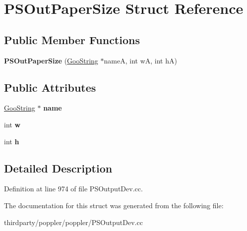 \hypertarget{struct_p_s_out_paper_size}{}\section{P\+S\+Out\+Paper\+Size Struct Reference}
\label{struct_p_s_out_paper_size}
\subsection*{Public Member Functions}
\begin{DoxyCompactItemize}
\item 
\mbox{\label{struct_p_s_out_paper_size_ace8df607ac921cf4627967399b6ac778}} 
{\bfseries P\+S\+Out\+Paper\+Size} (\hyperlink{class_goo_string}{Goo\+String} $\ast$nameA, int wA, int hA)
\end{DoxyCompactItemize}
\subsection*{Public Attributes}
\begin{DoxyCompactItemize}
\item 
\mbox{\label{struct_p_s_out_paper_size_a5b716b267e257ea940529d0ff8f43523}} 
\hyperlink{class_goo_string}{Goo\+String} $\ast$ {\bfseries name}
\item 
\mbox{\label{struct_p_s_out_paper_size_a0b9e5cd577cc4faef91201416b950a80}} 
int {\bfseries w}
\item 
\mbox{\label{struct_p_s_out_paper_size_a2cf1dc24651d2ab2fdb95b65ba3758ba}} 
int {\bfseries h}
\end{DoxyCompactItemize}


\subsection{Detailed Description}


Definition at line 974 of file P\+S\+Output\+Dev.\+cc.



The documentation for this struct was generated from the following file\+:\begin{DoxyCompactItemize}
\item 
thirdparty/poppler/poppler/P\+S\+Output\+Dev.\+cc\end{DoxyCompactItemize}
